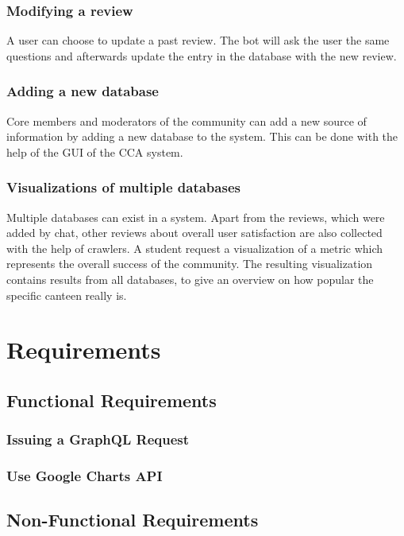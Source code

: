 \subsubsection{Modifying a review} A user can choose to update a past review. The bot will ask the user the same questions and afterwards update the entry in the database with the new review.

\subsubsection{Adding a new database} Core members and moderators of the community can add a new source of information by adding a new database to the system. This can be done with the help of the GUI of the CCA system.

\subsubsection{Visualizations of multiple databases} Multiple databases can exist in a system. Apart from the reviews, which were added by chat, other reviews about overall user satisfaction are also collected with the help of crawlers. A student request a visualization of a metric which represents the overall success of the community. The resulting visualization contains results from all databases, to give an overview on how popular the specific canteen really is.

\section{Requirements}

\subsection{Functional Requirements}

\subsubsection{Issuing a GraphQL Request}

\subsubsection{Use Google Charts API}

\subsubsection{}

\subsection{Non-Functional Requirements}